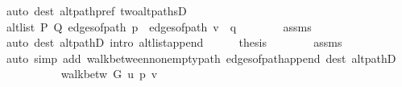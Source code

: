 \begin{isabellebody}
\ {\isacharparenleft}{\kern0pt}auto\ dest{\isacharcolon}{\kern0pt}\ alt{\isacharunderscore}{\kern0pt}path{\isacharunderscore}{\kern0pt}pref\ two{\isacharunderscore}{\kern0pt}alt{\isacharunderscore}{\kern0pt}pathsD{\isacharparenright}{\kern0pt}\isanewline
\ \ \ \ \isamarkupfalse%
\ \isamarkupfalse%
\ {\isachardoublequoteopen}alt{\isacharunderscore}{\kern0pt}list\ P\ Q\ {\isacharparenleft}{\kern0pt}edges{\isacharunderscore}{\kern0pt}of{\isacharunderscore}{\kern0pt}path\ p{\isacharprime}{\kern0pt}\ {\isacharat}{\kern0pt}\ edges{\isacharunderscore}{\kern0pt}of{\isacharunderscore}{\kern0pt}path\ {\isacharparenleft}{\kern0pt}v\ {\isacharhash}{\kern0pt}\ q{\isacharparenright}{\kern0pt}{\isacharparenright}{\kern0pt}{\isachardoublequoteclose}\isanewline
\ \ \ \ \ \ \isamarkupfalse%
\ assms{\isacharparenleft}{\kern0pt}{}{\isacharparenright}{\kern0pt}\isanewline
\ \ \ \ \ \ \isamarkupfalse%
\ {\isacharparenleft}{\kern0pt}auto\ dest{\isacharcolon}{\kern0pt}\ alt{\isacharunderscore}{\kern0pt}pathD{\isacharparenleft}{\kern0pt}{}{\isacharparenright}{\kern0pt}\ intro{\isacharcolon}{\kern0pt}\ alt{\isacharunderscore}{\kern0pt}list{\isacharunderscore}{\kern0pt}append{\isacharunderscore}{\kern0pt}{}{\isacharparenright}{\kern0pt}\isanewline
\ \ \ \ \isamarkupfalse%
\ {\isacharquery}{\kern0pt}thesis\isanewline
\ \ \ \ \ \ \isamarkupfalse%
\ assms{\isacharparenleft}{\kern0pt}{}{\isacharparenright}{\kern0pt}\isanewline
\ \ \ \ \ \ \isamarkupfalse%
\ {\isacharparenleft}{\kern0pt}auto\ simp\ add{\isacharcolon}{\kern0pt}\ walk{\isacharunderscore}{\kern0pt}between{\isacharunderscore}{\kern0pt}nonempty{\isacharunderscore}{\kern0pt}path{\isacharparenleft}{\kern0pt}{}{\isacharparenright}{\kern0pt}\ edges{\isacharunderscore}{\kern0pt}of{\isacharunderscore}{\kern0pt}path{\isacharunderscore}{\kern0pt}append{\isacharunderscore}{\kern0pt}{}\ dest{\isacharcolon}{\kern0pt}\ alt{\isacharunderscore}{\kern0pt}pathD{\isacharparenleft}{\kern0pt}{}{\isacharparenright}{\kern0pt}{\isacharparenright}{\kern0pt}\isanewline
\ \ \isamarkupfalse%
\isanewline
{}\isamarkupfalse%
\isanewline
\ \ \isamarkupfalse%
\ {}\isanewline
\ \ \isamarkupfalse%
\ {\isachardoublequoteopen}walk{\isacharunderscore}{\kern0pt}betw\ G\ u\ p{\isacharprime}{\kern0pt}\ v{\isachardoublequoteclose}\isanewline
\ \ \ \ \isamarkupfalse%

\end{isabellebody}
